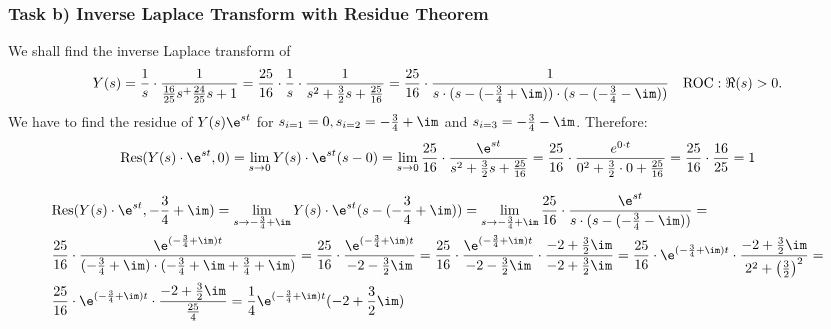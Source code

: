 \subsubsection{Task b) Inverse Laplace Transform with Residue Theorem}
We shall find the inverse Laplace transform of
\begin{align}
	Y(s) = \frac{1}{s}\cdot \frac{1}{\frac{16}{25}s^+\frac{24}{25}s+1}=\frac{25}{16}\cdot\frac{1}{s}\cdot\frac{1}{s^2+\frac{3}{2}s+\frac{25}{16}}=\frac{25}{16}\cdot\frac{1}{s\cdot(s-(-\frac{3}{4}+\im))\cdot(s-(-\frac{3}{4}-\im))}
\quad \text{ROC}: \Re(s) > 0
	. \nonumber
\end{align}
We have to find the residue of $Y(s)\e^{st}$ for $s_{i=1}=0, s_{i=2}=-\frac{3}{4}+\im$ and $s_{i=3}=-\frac{3}{4}-\im$.
%
Therefore:
%
\begin{align}
	\mathrm{Res}(Y(s)\cdot\e^{st},0)=\lim\limits_{s\rightarrow 0}Y(s)\cdot\e^{st} (s-0)=\lim\limits_{s\rightarrow0}\frac{25}{16}\cdot\frac{\e^{st}}{s^2 +\frac{3}{2}s+\frac{25}{16}}=\frac{25}{16}\cdot\frac{e^{0 \cdot t}}{0^2+\frac{3}{2}\cdot0+\frac{25}{16}}=\frac{25}{16}\cdot\frac{16}{25}=1
\end{align}

\begin{align}
&	\mathrm{Res}(Y(s)\cdot\e^{st},-\frac{3}{4}+\im)=\lim\limits_{s\rightarrow -\frac{3}{4}+\im}Y(s)\cdot\e^{st}(s-(-\frac{3}{4}+\im))=\lim\limits_{s\rightarrow -\frac{3}{4}+\im}\frac{25}{16}\cdot\frac{\e^{st}}{s\cdot(s-(-\frac{3}{4}-\im))} = \nonumber \\
&	\frac{25}{16}\cdot\frac{\e^{(-\frac{3}{4}+\im)t}}{(-\frac{3}{4}+\im)\cdot(-\frac{3}{4}+\im+\frac{3}{4}+\im)}=\frac{25}{16}\cdot\frac{\e^{(-\frac{3}{4}+\im)t}}{-2-\frac{3}{2}\im}=\frac{25}{16}\cdot\frac{\e^{(-\frac{3}{4}+\im)t}}{-2-\frac{3}{2}\im}\cdot\frac{-2+\frac{3}{2}\im}{-2+\frac{3}{2}\im}=\frac{25}{16}\cdot\e^{(-\frac{3}{4}+\im)t}\cdot\frac{-2+\frac{3}{2}\im}{2^2+\big (\frac{3}{2}\big)^2}=\nonumber \\
&	\frac{25}{16}\cdot\e^{(-\frac{3}{4}+\im)t}\cdot\frac{-2+\frac{3}{2}\im}{\frac{25}{4}}=\frac{1}{4}\e^{(-\frac{3}{4}+\im)t}(-2+\frac{3}{2}\im)
\end{align}

